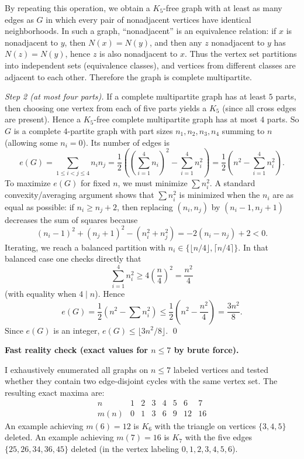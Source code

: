 By repeating this operation, we obtain a $K_5$-free graph with at least as many edges as $G$ in which every pair of nonadjacent vertices have identical neighborhoods.
In such a graph, ``nonadjacent'' is an equivalence relation: if $x$ is nonadjacent to $y$, then $N(x)=N(y)$, and then any $z$ nonadjacent to $y$ has $N(z)=N(y)$, hence $z$ is also nonadjacent to $x$.
Thus the vertex set partitions into independent sets (equivalence classes), and vertices from different classes are adjacent to each other.
Therefore the graph is complete multipartite.

\emph{Step 2 (at most four parts).}
If a complete multipartite graph has at least $5$ parts, then choosing one vertex from each of five parts yields a $K_5$ (since all cross edges are present).
Hence a $K_5$-free complete multipartite graph has at most $4$ parts.
So $G$ is a complete $4$-partite graph with part sizes $n_1,n_2,n_3,n_4$ summing to $n$ (allowing some $n_i=0$).
Its number of edges is
\[
 e(G)=\sum_{1\le i<j\le 4} n_i n_j
 =\frac12\left(\left(\sum_{i=1}^4 n_i\right)^2-\sum_{i=1}^4 n_i^2\right)
 =\frac12\left(n^2-\sum_{i=1}^4 n_i^2\right).
\]
To maximize $e(G)$ for fixed $n$, we must minimize $\sum n_i^2$.
A standard convexity/averaging argument shows that $\sum n_i^2$ is minimized when the $n_i$ are as equal as possible: if $n_i\ge n_j+2$, then replacing $(n_i,n_j)$ by $(n_i-1,n_j+1)$ decreases the sum of squares because
\[
(n_i-1)^2+(n_j+1)^2-(n_i^2+n_j^2)= -2(n_i-n_j)+2<0.
\]
Iterating, we reach a balanced partition with $n_i\in\{\lfloor n/4\rfloor,\lceil n/4\rceil\}$.
In that balanced case one checks directly that
\[
\sum_{i=1}^4 n_i^2\ge 4\left(\frac n4\right)^2=\frac{n^2}{4}
\]
(with equality when $4\mid n$).
Hence
\[
 e(G)=\frac12\left(n^2-\sum n_i^2\right)\le \frac12\left(n^2-\frac{n^2}{4}\right)=\frac{3n^2}{8}.
\]
Since $e(G)$ is an integer, $e(G)\le\lfloor 3n^2/8\rfloor$.
\qed

\bigskip
\noindent\textbf{Fast reality check (exact values for $n\le 7$ by brute force).}

I exhaustively enumerated all graphs on $n\le 7$ labeled vertices and tested whether they contain two edge-disjoint cycles with the same vertex set.
The resulting exact maxima are:
\[
\begin{array}{c|ccccccc}
 n & 1&2&3&4&5&6&7\\\hline
 m(n) & 0&1&3&6&9&12&16
\end{array}
\]
An example achieving $m(6)=12$ is $K_6$ with the triangle on vertices $\{3,4,5\}$ deleted.
An example achieving $m(7)=16$ is $K_7$ with the five edges
$\{25,26,34,36,45\}$ deleted (in the vertex labeling $0,1,2,3,4,5,6$).

